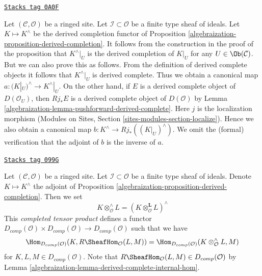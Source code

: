 \begin{remark}

\label{algebraization-remark-localization-and-completion}
\href{https://stacks.math.columbia.edu/tag/0A0F}{\texttt{Stacks tag 0A0F}}

Let $(\mathcal{C}, \mathcal{O})$ be a ringed site.
Let $\mathcal{I} \subset \mathcal{O}$ be a finite type sheaf of
ideals. Let $K \mapsto K^\wedge$ be the derived completion functor
of Proposition \ref{algebraization-proposition-derived-completion}. It follows
from the construction in the proof of the proposition that $K^\wedge|_U$
is the derived completion of $K|_U$ for any $U \in \Ob(\mathcal{C})$.
But we can also prove this as follows. From the definition
of derived complete objects it follows that $K^\wedge|_U$ is derived complete.
Thus we obtain a canonical map $a : (K|_U)^\wedge \to K^\wedge|_U$.
On the other hand, if $E$ is a derived complete object of
$D(\mathcal{O}_U)$, then $Rj_*E$ is a derived complete object of
$D(\mathcal{O})$ by Lemma \ref{algebraization-lemma-pushforward-derived-complete}.
Here $j$ is the localization morphism
(Modules on Sites, Section \ref{sites-modules-section-localize}).
Hence we also obtain a canonical
map $b : K^\wedge \to Rj_*((K|_U)^\wedge)$. We omit the (formal) verification
that the adjoint of $b$ is the inverse of $a$.
\end{remark}

\begin{remark}

\label{algebraization-remark-completed-tensor-product}
\href{https://stacks.math.columbia.edu/tag/099G}{\texttt{Stacks tag 099G}}

Let $(\mathcal{C}, \mathcal{O})$ be a ringed site. Let
$\mathcal{I} \subset \mathcal{O}$ be a finite type sheaf of ideals.
Denote $K \mapsto K^\wedge$ the adjoint of
Proposition \ref{algebraization-proposition-derived-completion}.
Then we set
$$
K \otimes^\wedge_\mathcal{O} L = (K \otimes_\mathcal{O}^\mathbf{L} L)^\wedge
$$
This {\it completed tensor product} defines a functor
$D_{comp}(\mathcal{O}) \times D_{comp}(\mathcal{O}) \to D_{comp}(\mathcal{O})$
such that we have
$$
\Hom_{D_{comp}(\mathcal{O})}(K, R\SheafHom_\mathcal{O}(L, M))
=
\Hom_{D_{comp}(\mathcal{O})}(K \otimes_\mathcal{O}^\wedge L, M)
$$
for $K, L, M \in D_{comp}(\mathcal{O})$. Note that
$R\SheafHom_\mathcal{O}(L, M) \in D_{comp}(\mathcal{O})$ by
Lemma \ref{algebraization-lemma-derived-complete-internal-hom}.
\end{remark}

